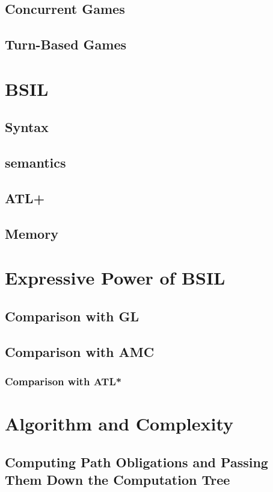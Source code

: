 \subsection{Concurrent Games}
\subsection{Turn-Based Games}


\section{BSIL}
\subsection{Syntax}
\subsection{semantics}
\subsection{ATL+}
\subsection{Memory}


\section{Expressive Power of BSIL}
\subsection{Comparison with GL}
\subsection{Comparison with AMC}
\subsubsection{Comparison with ATL*}

\section{Algorithm and Complexity}
\subsection{Computing Path Obligations and Passing Them Down the Computation Tree}
